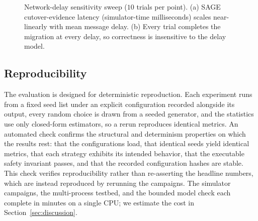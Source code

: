 \documentclass[journal]{IEEEtran}
\theoremstyle{remark}
\begin{document}
\begin{figure}[t]
\centering
{}
\caption{Network-delay sensitivity sweep ($10$ trials per point). (a) SAGE
cutover-evidence latency (simulator-time milliseconds) scales near-linearly with mean message
delay. (b) Every trial completes the migration at every delay, so correctness is insensitive to
the delay model.}
\label{fig:sens}
\end{figure}

\subsection{Reproducibility}
The evaluation is designed for deterministic reproduction. Each experiment runs from a fixed seed
list under an explicit configuration recorded alongside its output, every random choice is drawn
from a seeded generator, and the statistics use only closed-form estimators, so a rerun reproduces
identical metrics. An automated check confirms the structural and determinism properties on which
the results rest: that the configurations load, that identical seeds yield identical metrics, that
each strategy exhibits its intended behavior, that the executable safety invariant passes, and
that the recorded configuration hashes are stable. This check verifies reproducibility rather than
re-asserting the headline numbers, which are instead reproduced by rerunning the campaigns. The
simulator campaigns, the multi-process testbed, and the bounded model check each complete in
minutes on a single CPU; we estimate the cost in Section~\ref{sec:discussion}.

\end{document}
